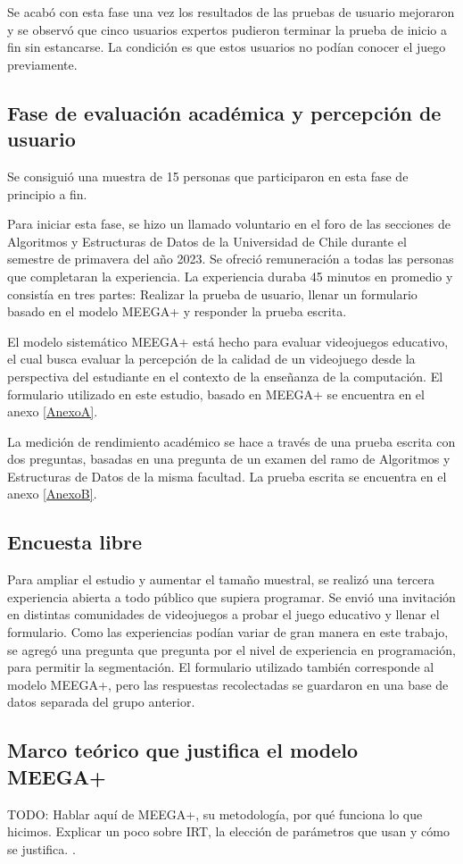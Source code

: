 Se acabó con esta fase una vez los resultados de las pruebas de usuario mejoraron y se observó que cinco usuarios expertos pudieron terminar la prueba de inicio a fin sin estancarse. La condición es que estos usuarios no podían conocer el juego previamente. 


\subsection{Fase de evaluación académica y percepción de usuario}

Se consiguió una muestra de 15 personas que participaron en esta fase de principio a fin.

Para iniciar esta fase, se hizo un llamado voluntario en el foro de las secciones de Algoritmos y Estructuras de Datos de la Universidad de Chile durante el semestre de primavera del año 2023. Se ofreció remuneración a todas las personas que completaran la experiencia. La experiencia duraba 45 minutos en promedio y consistía en tres partes: Realizar la prueba de usuario, llenar un formulario basado en el modelo MEEGA+ \cite{meegaplus} y responder la prueba escrita. %

El modelo sistemático MEEGA+ \cite{meegaplus} está hecho para evaluar videojuegos educativo, el cual busca evaluar la percepción de la calidad de un videojuego desde la perspectiva del estudiante en el contexto de la enseñanza de la computación.  El formulario utilizado en este estudio, basado en MEEGA+ \cite{meegaplus} se encuentra en el anexo \ref{AnexoA}.

La medición de rendimiento académico se hace a través de una prueba escrita con dos preguntas, basadas en una pregunta de un examen del ramo de Algoritmos y Estructuras de Datos de la misma facultad. La prueba escrita se encuentra en el anexo \ref{AnexoB}.

\subsection{Encuesta libre}


Para ampliar el estudio y aumentar el tamaño muestral, se realizó una tercera experiencia abierta a todo público que supiera programar. Se envió una invitación en distintas comunidades de videojuegos a probar el juego educativo y llenar el formulario. Como las experiencias podían variar de gran manera en este trabajo, se agregó una pregunta que pregunta por el nivel de experiencia en programación, para permitir la segmentación. El formulario utilizado también corresponde al modelo MEEGA+, pero las respuestas recolectadas se guardaron en una base de datos separada del grupo anterior. 


\subsection{Marco teórico que justifica el modelo MEEGA+}

TODO: Hablar aquí de MEEGA+, su metodología, por qué funciona lo que hicimos. Explicar un poco sobre IRT, la elección de parámetros que usan y cómo se justifica. \cite{MeegaPlusManual}.

